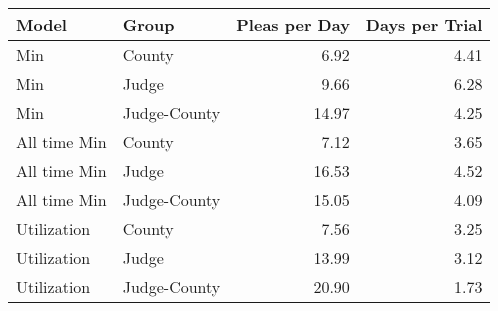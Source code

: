 \begin{tabular}{llrr}
\toprule
      Model &         Group &  Pleas per Day &  Days per Trial \\
\midrule
        Min &        County &           6.92 &            4.41 \\
        Min &       Judge &           9.66 &            6.28 \\
        Min & Judge-County &          14.97 &            4.25 \\
  All time Min &        County &           7.12 &            3.65 \\
  All time Min &       Judge &           16.53 &            4.52 \\
  All time Min & Judge-County &          15.05 &            4.09 \\
Utilization &        County &           7.56 &            3.25 \\
Utilization &       Judge &          13.99 &            3.12 \\
Utilization & Judge-County &          20.90 &            1.73 \\
\bottomrule
\end{tabular}
